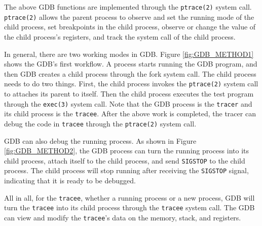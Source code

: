 The above GDB functions are implemented through the \verb|ptrace(2)| system call. 
\verb|ptrace(2)| allows the parent process to observe and set the running mode of 
the child process, set breakpoints in the child process, observe or 
change the value of the child process's registers, and track the system 
call of the child process.


In general, there are two working modes in GDB. Figure \ref{fig:GDB_METHOD1} shows 
the GDB's first workflow. A process starts running the GDB program, 
and then GDB creates a child process through the fork system call. 
The child process needs to do two things. First, the child process 
invokes the \verb|ptrace(2)| system call to attaches its parent to itself. 
Then the child process executes the test program through the \verb|exec(3)| 
system call. Note that the GDB process is the \verb|tracer| and its child process 
is the \verb|tracee|. After the above work is completed, the tracer can debug the
code in \verb|tracee| through the \verb|ptrace(2)| system call.


GDB can also debug the running process. As shown in Figure \ref{fig:GDB_METHOD2}, 
the GDB process can turn the running process into its child process, 
attach itself to the child process, and send \verb|SIGSTOP| to the child process. 
The child process will stop running after receiving the \verb|SIGSTOP| signal, 
indicating that it is ready to be debugged.

All in all, for the \verb|tracee|, whether a running process or 
a new process, GDB will turn the \verb|tracee| into its child process 
through the \verb|tracee| system call. The  GDB can view  and modify 
the \verb|tracee|'s data on the memory, stack, and registers.


\cleardoublepage


